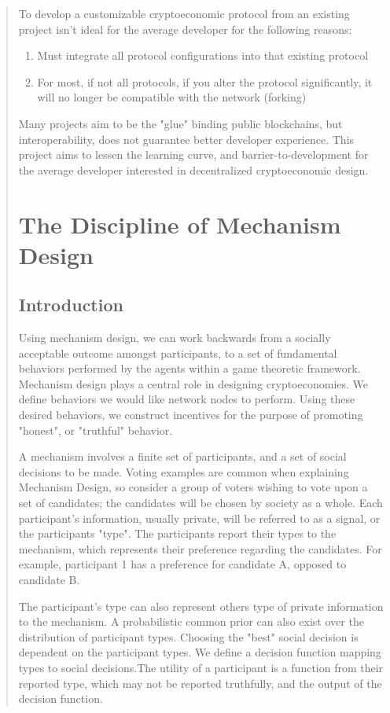 \documentclass[12pt, titlepage, twocolumn]{report}
\begin{document}
\begin{quotation}
To develop a customizable cryptoeconomic protocol from an existing project isn't ideal for the average developer for the following reasons:
	
\begin{enumerate}
	\item Must integrate all protocol configurations into that existing protocol
	\item For most, if not all protocols, if you alter the protocol significantly, it will no longer be compatible with the network (forking)
\end{enumerate}	
	
Many projects aim to be the "glue" binding public blockchains, but interoperability, does not guarantee better developer experience. This project aims to lessen the learning curve, and barrier-to-development for the average developer interested in decentralized cryptoeconomic design.


\chapter{The Discipline of Mechanism Design}


\section{Introduction}
Using mechanism design, we can work backwards from a socially acceptable outcome amongst participants, to a set of fundamental behaviors performed by the agents within a game theoretic framework. Mechanism design plays a central role in designing cryptoeconomies. We define behaviors we would like network nodes to perform. Using these desired behaviors, we construct incentives for the purpose of promoting "honest", or "truthful" behavior.

A mechanism involves a finite set of participants, and a set of social decisions to be made. Voting examples are common when explaining Mechanism Design, so consider a group of voters wishing to vote upon a set of candidates; the candidates will be chosen by society as a whole. Each participant's information, usually private, will be referred to as a signal, or the participants "type". The participants report their types to the mechanism, which represents their preference regarding the candidates. For example, participant 1 has a preference for candidate A, opposed to candidate B. 


The participant's type can also represent others type of private information to the mechanism. A probabilistic common prior can also exist over the distribution of participant types. Choosing the "best" social decision is dependent on the participant types. We define a decision function mapping types to social decisions.The utility of a participant is a function from their reported type, which may not be reported truthfully, and the output of the decision function.


\end{quotation}
\end{document}
